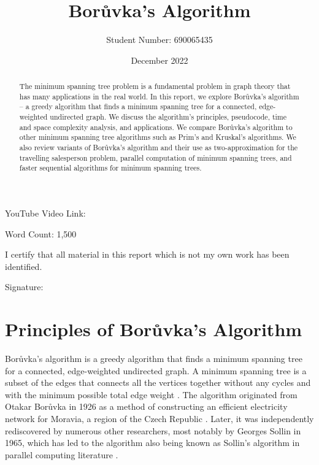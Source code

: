 \documentclass[a4paper, 11pt]{article}
\begin{document}
\title{Borůvka's Algorithm}
\author{Student Number: 690065435}
\date{December 2022}

\maketitle

\begin{abstract}
The minimum spanning tree problem is a fundamental problem in graph theory that has many applications in the real world. In this report, we explore Borůvka's algorithm -- a greedy algorithm that finds a minimum spanning tree for a connected, edge-weighted undirected graph. We discuss the algorithm's principles, pseudocode, time and space complexity analysis, and applications. We compare Borůvka's algorithm to other minimum spanning tree algorithms such as Prim's and Kruskal's algorithms. We also review variants of Borůvka's algorithm and their use as two-approximation for the travelling salesperson problem, parallel computation of minimum spanning trees, and faster sequential algorithms for minimum spanning trees.

\begin{center}
\end{center}
\end{abstract}

\vspace*{\fill}
\begin{center}
YouTube Video Link:

\vspace{0.5em}
Word Count: 1,500

\vspace{1em}
I certify that all material in this report which is not my own work has been identified.
\end{center}
\vspace{1em}

Signature: \hrulefill

\newpage
\section{Principles of Borůvka's Algorithm}
Borůvka's algorithm is a greedy algorithm that finds a minimum spanning tree for a connected, edge-weighted undirected graph. A minimum spanning tree is a subset of the edges that connects all the vertices together without any cycles and with the minimum possible total edge weight \cite{graham1985history}. The algorithm originated from Otakar Borůvka in 1926 as a method of constructing an efficient electricity network for Moravia, a region of the Czech Republic \cite{nevsetvril2001otakar}. Later, it was independently rediscovered by numerous other researchers, most notably by Georges Sollin in 1965, which has led to the algorithm also being known as Sollin's algorithm in parallel computing literature \cite{sollin1965trace}. 
\end{document}

